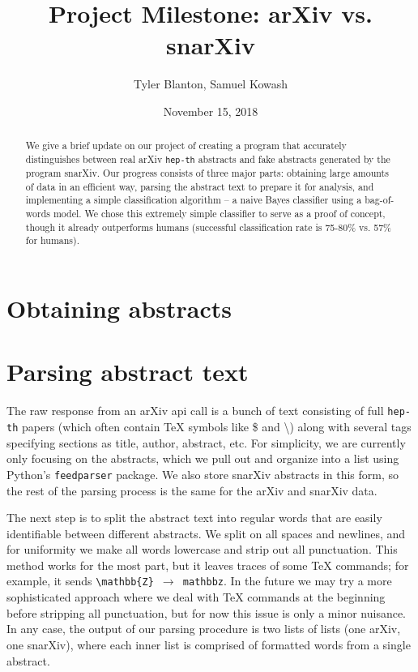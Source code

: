 \documentclass{article}
\title{Project Milestone: arXiv vs. snarXiv}
\author{Tyler Blanton, Samuel Kowash}
\date{November 15, 2018}
\begin{document}
\maketitle

\begin{abstract}
We give a brief update on our project of creating a program that accurately distinguishes between real arXiv \texttt{hep-th} abstracts and fake abstracts generated by the program snarXiv.
Our progress consists of three major parts: obtaining large amounts of data in an efficient way, parsing the abstract text to prepare it for analysis, and implementing a simple classification algorithm -- a naive Bayes classifier using a bag-of-words model.
We chose this extremely simple classifier to serve as a proof of concept, though it already outperforms humans (successful classification rate is 75-80\% vs. 57\% for humans).
\end{abstract}

\section{Obtaining abstracts}



\section{Parsing abstract text}
The raw response from an arXiv api call is a bunch of text consisting of full \texttt{hep-th} papers (which often contain TeX symbols like \$ and  \textbackslash) along with several tags specifying sections as title, author, abstract, etc.
For simplicity, we are currently only focusing on the abstracts, which we pull out and organize into a list using Python's \texttt{feedparser} package.
We also store snarXiv abstracts in this form, so the rest of the parsing process is the same for the arXiv and snarXiv data.

The next step is to split the abstract text into regular words that are easily identifiable between different abstracts.
We split on all spaces and newlines, and for uniformity we make all words lowercase and strip out all punctuation.
This method works for the most part, but it leaves traces of some TeX commands; for example, it sends \texttt{\textbackslash mathbb\{Z\} $\to$ mathbbz}.
In the future we may try a more sophisticated approach where we deal with TeX commands at the beginning before stripping all punctuation, but for now this issue is only a minor nuisance.
In any case, the output of our parsing procedure is two lists of lists (one arXiv, one snarXiv), where each inner list is comprised of formatted words from a single abstract.
\end{document}
